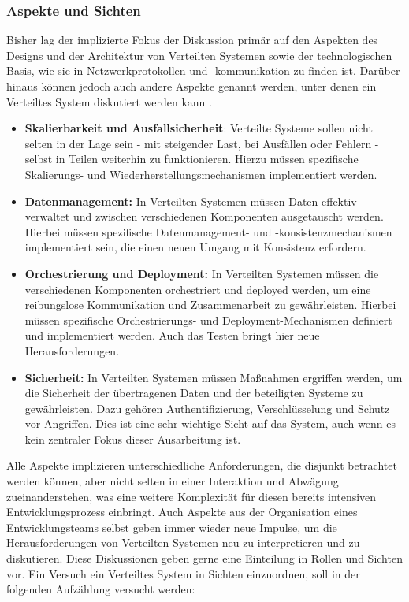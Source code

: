 \documentclass[../vs-script-first-v01.tex]{subfiles}
\begin{document}
\subsubsection{Aspekte und Sichten}
Bisher lag der implizierte Fokus der Diskussion primär auf den Aspekten des Designs und der Architektur von Verteilten Systemen sowie der technologischen Basis, wie sie in Netzwerkprotokollen und -kommunikation zu finden ist. Darüber hinaus können jedoch auch andere Aspekte genannt werden, unter denen ein Verteiltes System diskutiert werden kann \cite{tanenbaum2017distributed}.
\begin{itemize}
  \item \textbf{Skalierbarkeit und Ausfallsicherheit}: Verteilte Systeme sollen nicht selten in der Lage sein -  mit steigender Last, bei Ausfällen oder Fehlern - selbst in Teilen weiterhin zu funktionieren. Hierzu müssen spezifische Skalierungs- und Wiederherstellungsmechanismen implementiert werden.
  \item \textbf{Datenmanagement:} In Verteilten Systemen müssen Daten effektiv verwaltet und zwischen verschiedenen Komponenten ausgetauscht werden. Hierbei müssen spezifische Datenmanagement- und -konsistenzmechanismen implementiert sein, die einen neuen Umgang mit Konsistenz erfordern.
  \item \textbf{Orchestrierung und Deployment:} In Verteilten Systemen müssen die verschiedenen Komponenten orchestriert und deployed werden, um eine reibungslose Kommunikation und Zusammenarbeit zu gewährleisten. Hierbei müssen spezifische Orchestrierungs- und Deployment-Mechanismen definiert und implementiert werden. Auch das Testen bringt hier neue Herausforderungen.
  \item \textbf{Sicherheit:} In Verteilten Systemen müssen Maßnahmen ergriffen werden, um die Sicherheit der übertragenen Daten und der beteiligten Systeme zu gewährleisten. Dazu gehören Authentifizierung, Verschlüsselung und Schutz vor Angriffen. Dies ist eine sehr wichtige Sicht auf das System, auch wenn es kein zentraler Fokus dieser Ausarbeitung ist.
\end{itemize}
Alle Aspekte implizieren unterschiedliche Anforderungen, die disjunkt betrachtet werden können, aber nicht selten in einer Interaktion und Abwägung zueinanderstehen, was eine weitere Komplexität für diesen bereits intensiven Entwicklungsprozess einbringt. Auch Aspekte aus der Organisation eines Entwicklungsteams selbst geben immer wieder neue Impulse, um die Herausforderungen von Verteilten Systemen neu zu interpretieren und zu diskutieren. Diese Diskussionen geben gerne eine Einteilung in Rollen und Sichten vor. Ein Versuch ein Verteiltes System in Sichten einzuordnen, soll in der folgenden Aufzählung versucht werden:
\end{document}
